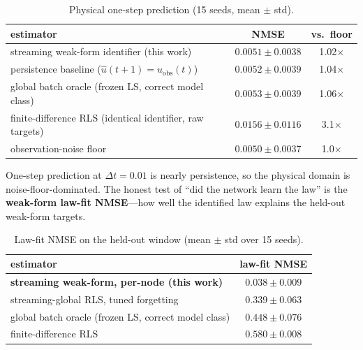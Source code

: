 \documentclass[11pt]{article}
\begin{document}
\begin{table}[h]
\centering
\caption{Physical one-step prediction (15 seeds, mean $\pm$ std).}
\begin{tabular}{lcc}
\toprule
estimator & NMSE & vs.\ floor \\
\midrule
streaming weak-form identifier (this work) & $0.0051 \pm 0.0038$ & 1.02$\times$ \\
persistence baseline ($\hat u(t{+}1)=u_{\mathrm{obs}}(t)$) & $0.0052 \pm 0.0039$ & 1.04$\times$ \\
global batch oracle (frozen LS, correct model class) & $0.0053 \pm 0.0039$ & 1.06$\times$ \\
finite-difference RLS (identical identifier, raw targets) & $0.0156 \pm 0.0116$ & 3.1$\times$ \\
observation-noise floor & $0.0050 \pm 0.0037$ & 1.0$\times$ \\
\bottomrule
\end{tabular}
\end{table}

One-step prediction at $\Delta t = 0.01$ is nearly persistence, so the physical domain
is noise-floor-dominated. The honest test of ``did the network learn the law'' is the
\textbf{weak-form law-fit NMSE}---how well the identified law explains the held-out
weak-form targets.

\begin{table}[h]
\centering
\caption{Law-fit NMSE on the held-out window (mean $\pm$ std over 15 seeds).}
\begin{tabular}{lc}
\toprule
estimator & law-fit NMSE \\
\midrule
\textbf{streaming weak-form, per-node (this work)} & $\mathbf{0.038 \pm 0.009}$ \\
streaming-global RLS, tuned forgetting & $0.339 \pm 0.063$ \\
global batch oracle (frozen LS, correct model class) & $0.448 \pm 0.076$ \\
finite-difference RLS & $0.580 \pm 0.008$ \\
\bottomrule
\end{tabular}
\end{table}
\end{document}
